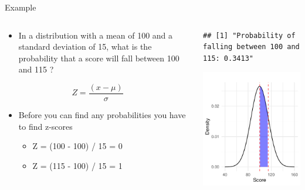 \documentclass[
  ignorenonframetext,
]{beamer}
\providecommand{\tightlist}{%
  \setlength{\itemsep}{0pt}\setlength{\parskip}{0pt}}
\begin{document}
\begin{frame}[fragile]{Example}
\label{example-5}
\begin{columns}[T]
\begin{column}{0.5\textwidth}
\begin{itemize}
\tightlist
\item
  In a distribution with a mean of 100 and a standard deviation of 15,
  what is the probability that a score will fall between 100 and 115 ?
\end{itemize}

\[ Z = \frac{(x - \mu)}{\sigma} \]

\vspace{1cm}

\begin{itemize}
\tightlist
\item
  Before you can find any probabilities you have to find z-scores

  \begin{itemize}
  \tightlist
  \item
    Z = (100 - 100) / 15 = 0
  \item
    Z = (115 - 100) / 15 = 1
  \end{itemize}
\end{itemize}
\end{column}

\begin{column}{0.5\textwidth}
\begin{verbatim}
## [1] "Probability of falling between 100 and 115: 0.3413"
\end{verbatim}

\includegraphics{M5-Hypothesis-Testing,-Probability-and-Distribution_files/figure-beamer/unnamed-chunk-25-1.pdf}
\end{column}
\end{columns}
\end{frame}
\end{document}

